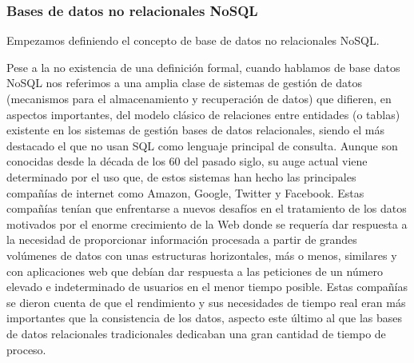 \subsubsection{Bases de datos no relacionales NoSQL}

Empezamos definiendo el concepto de base de datos no relacionales
 NoSQL.

Pese a la no existencia de una definición formal, cuando hablamos 
de base datos NoSQL nos referimos a una amplia clase de sistemas
 de gestión de datos (mecanismos para el almacenamiento y
 recuperación de datos) que difieren, en aspectos importantes, 
del modelo clásico de relaciones entre entidades (o tablas) existente
 en los sistemas de gestión bases de datos relacionales, siendo el más 
destacado el que no usan SQL como lenguaje principal de consulta.
Aunque son conocidas desde la década de los 60 del pasado siglo,
 su auge actual viene determinado por el uso que, de estos sistemas
 han hecho las principales compañías de internet como Amazon,
 Google, Twitter y Facebook. Estas compañías tenían que enfrentarse
 a nuevos desafíos en el tratamiento de los datos motivados por
 el enorme crecimiento de la Web donde se requería dar respuesta
 a la necesidad de proporcionar información procesada a partir de
 grandes volúmenes de datos con unas estructuras horizontales,
 más o menos, similares y con aplicaciones web que debían dar 
respuesta a las peticiones de un número elevado e indeterminado
 de usuarios en el menor tiempo posible. Estas compañías se dieron 
cuenta de que el rendimiento y sus necesidades de tiempo real eran
 más importantes que la consistencia de los datos, aspecto este último
 al que las bases de datos relacionales tradicionales dedicaban 
una gran cantidad de tiempo de proceso.

